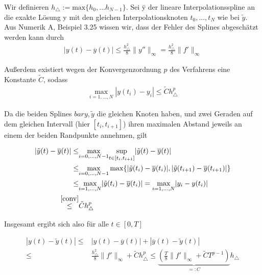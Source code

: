 \begin{solution}
  Wir definieren $h_{\triangle}:=\text{max}\{h_{0},...h_{N-1}\}$.
  Sei \=y der lineare Interpolationsspline an die exakte Lösung y mit den gleichen Interpolationsknoten $t_{0},...,t_{N}$ wie bei $\tilde{y}$.
  Aus Numerik A, Beispiel 3.25 wissen wir, dass der Fehler des Splines abgeschätzt werden kann durch
  \begin{align*}
    |y(t)-\overline{y}(t)| \leq \frac{h_{\triangle}^{2}}{8}\|y''\|_{\infty} = \frac{h_{\triangle}^{2}}{8}\|f'\|_{\infty}
  \end{align*}

  Außerdem existiert wegen der Konvergenzordnung $p$ des Verfahrens eine Konstante $\tilde{C}$, sodass
  \begin{align}\label{conv}
    \underset{i=1,...,N}{\max} |y(t_{i})-y_{i}| \leq \tilde{C}h_{\triangle}^{p}
  \end{align}

  Da die beiden Splines $bar{y}, \tilde{y}$ die gleichen Knoten haben, und zwei Geraden auf dem gleichen Intervall (hier $[t_{i},t_{i+1}]$) ihren maximalen Abstand jeweils an einem der beiden Randpunkte annehmen, gilt

  \begin{align*}
    |\tilde{y}(t)-\overline{y}(t)| \leq& \underset{i=0,...,N-1}{\max} \underset{t \in [t_{i},t_{i+1}]}{\sup} |\tilde{y}(t)-\overline{y}(t)| \\
    \leq& \underset{i=0,...,N-1}{\max} \max \{|\tilde{y}(t_{i})-\overline{y}(t_{i})|, |\tilde{y}(t_{i+1})-\overline{y}(t_{i+1})| \} \\
    \leq& \underset{i=1,...,N}{\max}|\tilde{y}(t_{i})-\overline{y}(t_{i})| = \underset{i=1,...,N}{\max}|y_{i}- y(t_{i})| \\
    \stackrel{\eqref{conv}}{\leq}& \tilde{C}h_{\triangle}^{p}
  \end{align*}

  Insgesamt ergibt sich also für alle $t \in [0,T]$

  \begin{align*}
    |y(t)-\tilde{y}(t)| \leq& |y(t)-\overline{y}(t)| + |\overline{y}(t)-\tilde{y}(t)| \\
    \leq& \frac{h_{\triangle}^{2}}{8}\|f'\|_{\infty} + \tilde{C}h_{\triangle}^{p} \leq \underbrace{(\frac{T}{8}\|f'\|_{\infty} + \tilde{C}T^{p-1})}_{=:C} h_{\triangle}
  \end{align*}


\end{solution}
